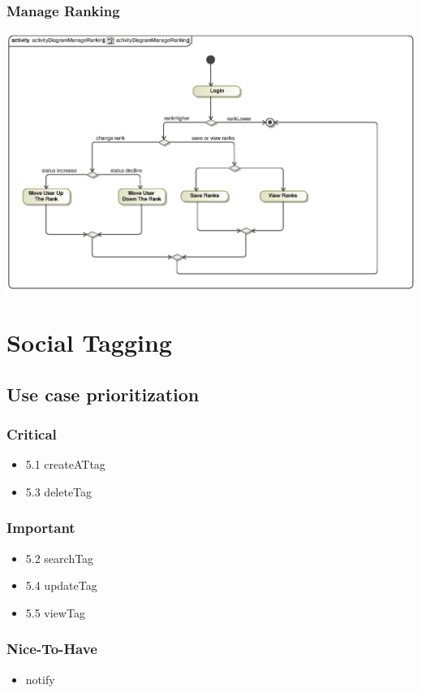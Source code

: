 \documentclass[hidelinks, 12pt, oneside]{article}
\begin{document}
\subsubsection{Manage Ranking}
\includegraphics[scale=.9]{Kgomotso/graphics/activityDiagramManageRanking.eps}\\



\section{Social Tagging}
\subsection{Use case prioritization}
\subsubsection{Critical}
\begin{itemize}
  \item 5.1 createATtag
  \item 5.3 deleteTag
\end{itemize}

\subsubsection{Important}
\begin{itemize}
  \item 5.2 searchTag
  \item 5.4 updateTag
  \item 5.5 viewTag
\end{itemize}
\subsubsection{Nice-To-Have}
\begin{itemize}
  \item notify
\end{itemize}
\end{document}
